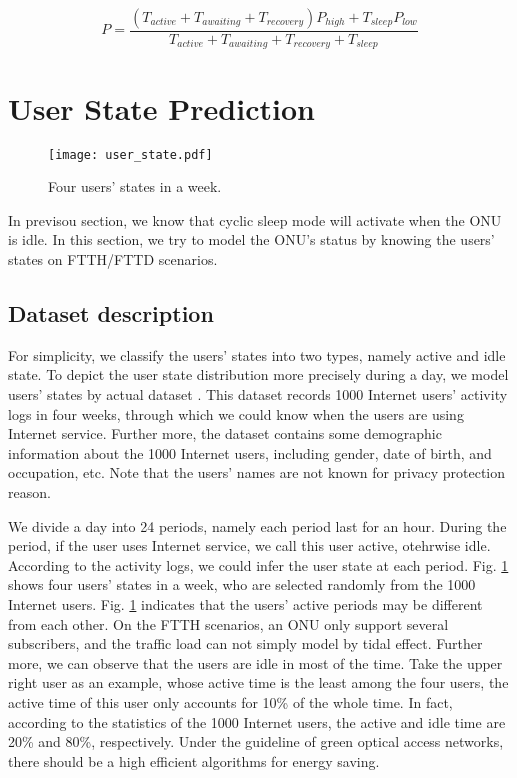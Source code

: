 \documentclass[journal]{IEEEtran}
\begin{document}
\begin{footnotesize}
\begin{equation}
P = \frac{({T_{active} + T_{awaiting} + T_{recovery}}){P_{high}} + T_{sleep}P_{low}}{T_{active} + T_{awaiting} + T_{recovery} + T_{sleep}}
\end{equation}
\end{footnotesize}

\section{User State Prediction}

\begin{figure}[t]
	\centering 
	\texttt{[image: user\_state.pdf]}\\ 
	\caption{ Four users' states in a week.}
	\label{user_state}
\end{figure}



In previsou section, we know that cyclic sleep mode will activate when the ONU is idle. In this section, we try to model the ONU's status by knowing the users' states on FTTH/FTTD scenarios.

\subsection{Dataset description}
For simplicity, we classify the users' states into two types, namely active and idle state. To depict the user state distribution more precisely during a day, we model users' states by actual dataset \cite{Datatang}. This dataset records 1000 Internet users' activity logs in four weeks, through which we could know when the users are using Internet service. Further more, the dataset contains some demographic information about the 1000 Internet users, including gender, date of birth, and occupation, etc. Note that the users' names are not known for privacy protection reason. 

We divide a day into 24 periods, namely each period last for an hour. During the period, if the user uses Internet service, we call this user active, otehrwise idle. According to the activity logs, we could infer the user state at each period. Fig. \ref{user_state} shows four users' states in a week, who are selected randomly from the 1000 Internet users. Fig. \ref{user_state} indicates that the users' active periods may be different from each other. On the FTTH scenarios, an ONU only support several subscribers, and the traffic load can not simply model by tidal effect. Further more, we can observe that the users are idle in most of the time. Take the upper right user as an example, whose active time is the least among the four users, the active time of this user only accounts for 10\% of the whole time. In fact, according to the statistics of the 1000 Internet users, the active and idle time are 20\% and 80\%, respectively. Under the guideline of green optical access networks, there should be a high efficient algorithms for energy saving.
\end{document}
